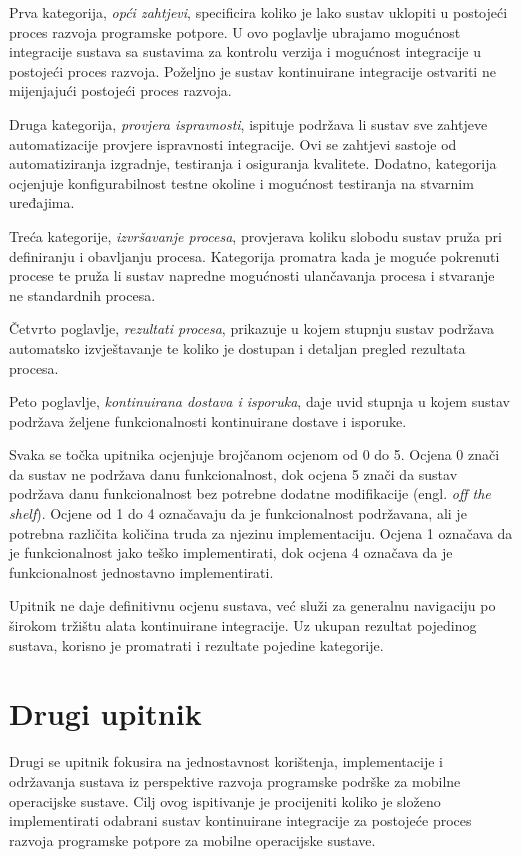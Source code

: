\documentclass[times, utf8, diplomski, numeric]{fer}
\newcommand{\eng}[1]{(engl. \textit{#1})}
\begin{document}
\begin{appendices}
Prva kategorija, \textit{opći zahtjevi}, specificira koliko je lako sustav uklopiti u postojeći proces razvoja programske potpore. U ovo poglavlje ubrajamo mogućnost integracije sustava sa sustavima za kontrolu verzija i mogućnost integracije u postojeći proces razvoja. Poželjno je sustav kontinuirane integracije ostvariti ne mijenjajući postojeći proces razvoja.

Druga kategorija, \textit{provjera ispravnosti}, ispituje podržava li sustav sve zahtjeve automatizacije provjere ispravnosti integracije. Ovi se zahtjevi sastoje od automatiziranja izgradnje, testiranja i osiguranja kvalitete. Dodatno, kategorija ocjenjuje konfigurabilnost testne okoline i mogućnost testiranja na stvarnim uređajima.

Treća kategorije, \textit{izvršavanje procesa}, provjerava koliku slobodu sustav pruža pri definiranju i obavljanju procesa. Kategorija promatra kada je moguće pokrenuti procese te pruža li sustav napredne mogućnosti ulančavanja procesa i stvaranje ne standardnih procesa.

Četvrto poglavlje, \textit{rezultati procesa}, prikazuje u kojem stupnju sustav podržava automatsko izvještavanje te koliko je dostupan i detaljan pregled rezultata procesa.

Peto poglavlje, \textit{kontinuirana dostava i isporuka}, daje uvid stupnja u kojem sustav podržava željene funkcionalnosti kontinuirane dostave i isporuke.

Svaka se točka upitnika ocjenjuje brojčanom ocjenom od 0 do 5. Ocjena 0 znači da sustav ne podržava danu funkcionalnost, dok ocjena 5 znači da sustav podržava danu funkcionalnost bez potrebne dodatne modifikacije \eng{off the shelf}. Ocjene od 1 do 4 označavaju da je funkcionalnost podržavana, ali je potrebna različita količina truda za njezinu implementaciju. Ocjena 1 označava da je funkcionalnost jako teško implementirati, dok ocjena 4 označava da je funkcionalnost jednostavno implementirati.

Upitnik ne daje definitivnu ocjenu sustava, već služi za generalnu navigaciju po širokom tržištu alata kontinuirane integracije. Uz ukupan rezultat pojedinog sustava, korisno je promatrati i rezultate pojedine kategorije.

\section{Drugi upitnik}
Drugi se upitnik fokusira na jednostavnost korištenja, implementacije i održavanja sustava iz perspektive razvoja programske podrške za mobilne operacijske sustave. Cilj ovog ispitivanje je procijeniti koliko je složeno implementirati odabrani sustav kontinuirane integracije za postojeće proces razvoja programske potpore za mobilne operacijske sustave.


\end{appendices}
\end{document}
